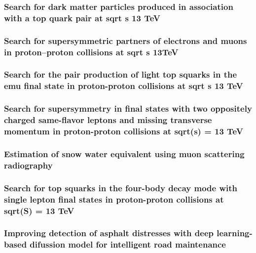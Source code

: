 \documentclass[a4paper, 11pt, twoside, openright]{report}
\begin{document}
\subsubsection{Search for dark matter particles produced in association with a top quark pair at sqrt s 13 TeV}
%
\subsubsection{Search for supersymmetric partners of electrons and muons in proton–proton collisions at sqrt s 13TeV}
%
\subsubsection{Search for the pair production of light top squarks in the emu final state in proton-proton collisions at sqrt s 13 TeV}
%
\subsubsection{Search for supersymmetry in final states with two oppositely charged same-flavor leptons and missing transverse momentum in proton-proton collisions at sqrt(s) = 13 TeV}
%
\subsubsection{Estimation of snow water equivalent using muon scattering radiography}
%
\subsubsection{Search for top squarks in the four-body decay mode with single lepton final states in proton-proton collisions at sqrt(S) = 13 TeV}
%
\subsubsection{Improving detection of asphalt distresses with deep learning-based difussion model for intelligent road maintenance}
%
\end{document}
